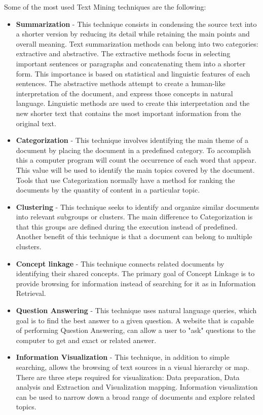 Some of the most used Text Mining techniques\cite{gupta2009survey}\cite{tseng2007text}\cite{patel2012text} are the following:
\begin{itemize}
    \item \textbf{Summarization} - This technique consists in condensing the source text into a shorter version by reducing its detail while retaining the main points and overall meaning.
            Text summarization methods can belong into two categories: extractive and abstractive.
            The extractive methods focus in selecting important sentences or paragraphs and concatenating them into a shorter form.
            This importance is based on statistical and linguistic features of each sentences.
            The abstractive methods attempt to create a human-like interpretation of the document, and express those concepts in natural language.
            Linguistic methods are used to create this interpretation and the new shorter text that contains the most important information from the original text.
        \item \textbf{Categorization} - This technique involves identifying the main theme of a document by placing the document in a predefined category.
            To accomplish this a computer program will count the occurrence of each word that appear.
            This value will be used to identify the main topics covered by the document.
            Tools that use Categorization normally have a method for ranking the documents by the quantity of content in a particular topic.
        \item \textbf{Clustering} - This technique seeks to identify and organize similar documents into relevant subgroups or clusters.
            The main difference to Categorization is that this groups are defined during the execution instead of predefined.
            Another benefit of this technique is that a document can belong to multiple clusters.
        \item \textbf{Concept linkage} - This technique connects related documents by identifying their shared concepts.
            The primary goal of Concept Linkage is to provide browsing for information instead of searching for it as in Information Retrieval.
        \item \textbf{Question Answering} - This technique uses natural language queries, which goal is to find the best answer to a given question.
            A website that is capable of performing Question Answering, can allow a user to "ask" questions to the computer to get and exact or related answer.
        \item \textbf{Information Visualization} - This technique, in addition to simple searching, allows the browsing of text sources in a visual hierarchy or map.
            There are three steps required for visualization: Data preparation, Data analysis and Extraction and Visualization mapping.
            Information visualization can be used to narrow down a broad range of documents and explore related topics.
\end{itemize}

